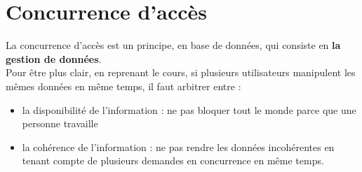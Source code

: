 \documentclass{report}
\begin{document}
\chapter{Concurrence d'accès}
La concurrence d'accès est un principe, en base de données, qui consiste en \textbf{la gestion de données}.\\
Pour être plus clair, en reprenant le cours, si plusieurs utilisateurs manipulent les mêmes données en même temps, il faut arbitrer entre :
\begin{itemize}
\item la disponibilité de l'information : ne pas bloquer tout le monde parce que une personne travaille
\item la cohérence de l'information : ne pas rendre les données incohérentes en tenant compte de plusieurs demandes en concurrence en même temps.
\end{itemize}
\end{document}
